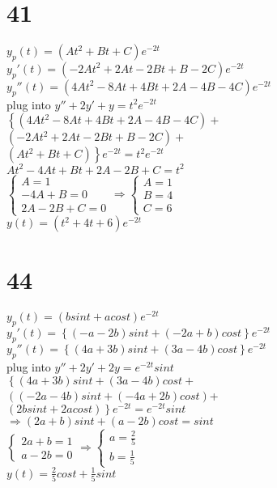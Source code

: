 \documentclass[12pt, a4paper]{IEEEtran}
\begin{document}
\begin{flushleft}
    \section*{41}
    $y_p(t)=(At^2+Bt+C)e^{-2t}$\\
    $y_p'(t)=(-2At^2+2At-2Bt+B-2C)e^{-2t}$\\
    $y_p''(t)=(4At^2-8At+4Bt+2A-4B-4C)e^{-2t}$\\
    plug into $y''+2y'+y=t^2e^{-2t}$\\
    $\left\{(4At^2-8At+4Bt+2A-4B-4C)+\right .$\\
    $(-2At^2+2At-2Bt+B-2C)+$\\
    $\left .(At^2+Bt+C)\right\}e^{-2t}=t^2e^{-2t}$\\
    $At^2-4At+Bt+2A-2B+C=t^2$\\
    $\begin{cases}
        A=1\\
        -4A+B=0\\
        2A-2B+C=0
    \end{cases}
    \Rightarrow
    \begin{cases}
        A=1\\
        B=4\\
        C=6
    \end{cases}$\\
    $y(t)=(t^2+4t+6)e^{-2t}$

\section*{44}
$y_p(t)=(bsint+acost)e^{-2t}$\\
$y_p'(t)=\left\{(-a-2b)sint+(-2a+b)cost\right\}e^{-2t}$\\
$y_p''(t)=\left\{(4a+3b)sint+(3a-4b)cost\right\}e^{-2t}$\\
plug into $y''+2y'+2y=e^{-2t}sint$\\
$\left\{(4a+3b)sint+(3a-4b)cost\right .+$\\
$((-2a-4b)sint+(-4a+2b)cost)$+\\
$\left . (2bsint+2acost)\right\}e^{-2t}=e^{-2t}sint$\\
$\Rightarrow (2a+b)sint+(a-2b)cost=sint$\\
$\begin{cases}
    2a+b=1\\
    a-2b=0
\end{cases}
\Rightarrow
\begin{cases}
    a=\frac{2}{5}\\
    b=\frac{1}{5}
\end{cases}$\\
$y(t)=\frac{2}{5}cost+\frac{1}{5}sint$


    
        
    

\end{flushleft}
\end{document}
